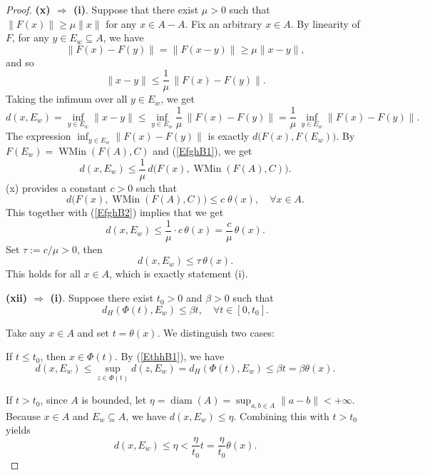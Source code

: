 \documentclass[11pt]{article}
\begin{document}
\begin{proof}
	
	
	
 

		
		
	\noindent\textbf{(x) $\Rightarrow$ (i)}.  Suppose that   there exist $\mu>0$ such that $\|F(x)\|\ge\mu\|x\|$ for any $x\in A-A$.    Fix an arbitrary $x\in A$.
					 By linearity of $F$, for any $y\in E_w    \subseteq   A$,  we have
			  \[
			 \|F(x)-F(y)\|=\|F(x-y)\|\ge\mu\|x-y\|,
			 \]
 and so 
		\[
		\|x-y\|\le\frac{1}{\mu}\,\|F(x)-F(y)\|.
		\]
		Taking the infimum over all $y\in E_w$, we get
		\begin{equation}\label{EfghB1}
		d(x,E_w)=\inf_{y\in E_w}\|x-y\|
		\le\inf_{y\in E_w}\frac{1}{\mu}\,\|F(x)-F(y)\|
		=\frac{1}{\mu}\,\inf_{y\in E_w}\|F(x)-F(y)\|.
	 \end{equation}
The expression $\inf_{y\in E_w}\|F(x)-F(y)\|$ is exactly $d \bigl(F(x),F(E_w)\bigr)$.  By  $F(E_w)=\operatorname{WMin}(F(A),C)$  and    (\ref{EfghB1}),  we get  
		\begin{equation}\label{EfghB2}
		d(x,E_w)\le\frac{1}{\mu}\,d \bigl(F(x),\operatorname{WMin}(F(A),C)\bigr).  
		 \end{equation}
		  (x) provides a constant $c>0$   such that    
  $$ d \bigl(F(x),\operatorname{WMin}(F(A),C)\bigr)     \le c \; \theta(x),   \quad  \forall x\in A.$$ 
	This together with   (\ref{EfghB2})    implies that  
	  we get
		\[
		d(x,E_w)\le\frac{1}{\mu}\cdot  c  \,\theta(x)=\frac{c}{\mu}\,\theta(x).
		\]
		Set $\tau:=c/\mu>0$,  then
		\[
		d(x,E_w)\le\tau\,\theta(x).
		\]
		This holds for all $x\in A$, which is exactly statement (i).
 
	
		 	\noindent\textbf{(xii) $\Rightarrow$ (i)}.
		Suppose there exist \(t_0 > 0\) and \(\beta > 0\) such that 
		\begin{equation}\label{EthhB1}
			d_H(\Phi(t), E_w) \le \beta t,  \quad  \forall t \in [0, t_0].
		\end{equation}
		
 
	Take any \(x \in A\) and set \(t = \theta(x)\). We distinguish two cases:
	
  If \(t \le t_0\), then \(x \in \Phi(t)\). By   (\ref{EthhB1}),  we have 
		\[
		d(x, E_w) \le \sup_{z \in \Phi(t)} d(z, E_w) = d_H(\Phi(t), E_w) \le \beta t = \beta \theta(x).
		\]
		
		 If \(t > t_0\), since \(A\) is bounded, let \(\eta = \operatorname{diam}(A) = \sup_{a,b \in A} \|a - b\| < +\infty\). Because \(x \in A\) and \(E_w \subseteq A\), we have \(d(x, E_w) \le \eta\). Combining this with \(t > t_0\) yields
		\[
		d(x, E_w) \le \eta < \frac{\eta}{t_0} t = \frac{\eta}{t_0} \theta(x).
		\]
 

\end{proof}
\end{document}
